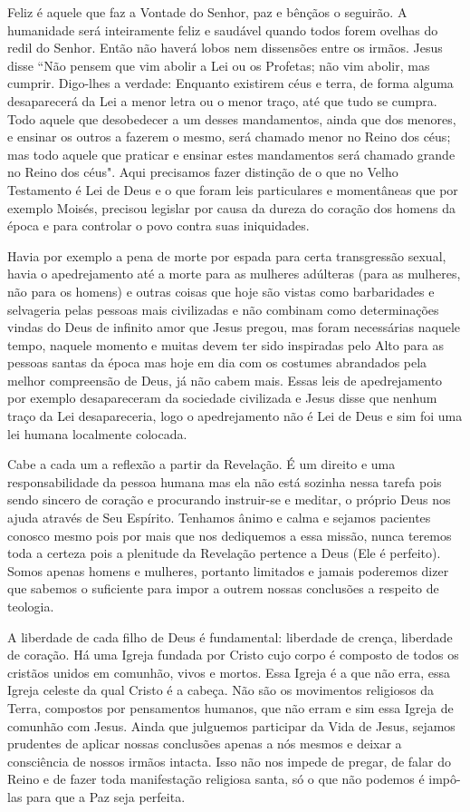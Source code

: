 \emdash{}Feliz é aquele que faz a Vontade do Senhor, paz e bênçãos o seguirão. A humanidade será inteiramente feliz e saudável quando todos forem ovelhas do redil do Senhor. Então não haverá lobos nem dissensões entre os irmãos. Jesus disse ``Não pensem que vim abolir a Lei ou os Profetas; não vim abolir, mas cumprir. Digo-lhes a verdade: Enquanto existirem céus e terra, de forma alguma desaparecerá da Lei a menor letra ou o menor traço, até que tudo se cumpra. Todo aquele que desobedecer a um desses mandamentos, ainda que dos menores, e ensinar os outros a fazerem o mesmo, será chamado menor no Reino dos céus; mas todo aquele que praticar e ensinar estes mandamentos será chamado grande no Reino dos céus". Aqui precisamos fazer distinção de o que no Velho Testamento é Lei de Deus e o que foram leis particulares e momentâneas que por exemplo Moisés, precisou legislar por causa da dureza do coração dos homens da época e para controlar o povo contra suas iniquidades.

\emdash{}Havia por exemplo a pena de morte por espada para certa transgressão sexual, havia o apedrejamento até a morte para as mulheres adúlteras (para as mulheres, não para os homens) e outras coisas que hoje são vistas como barbaridades e selvageria pelas pessoas mais civilizadas e não combinam como determinações vindas do Deus de infinito amor que Jesus pregou, mas foram necessárias naquele tempo, naquele momento e muitas devem ter sido inspiradas pelo Alto para as pessoas santas da época mas hoje em dia com os costumes abrandados pela melhor compreensão de Deus, já não cabem mais. Essas leis de apedrejamento por exemplo desapareceram da sociedade civilizada e Jesus disse que nenhum traço da Lei desapareceria, logo o apedrejamento não é Lei de Deus e sim foi uma lei humana localmente colocada.

\emdash{}Cabe a cada um a reflexão a partir da Revelação. É um direito e uma responsabilidade da pessoa humana mas ela não está sozinha nessa tarefa pois sendo sincero de coração e procurando instruir-se e meditar, o próprio Deus nos ajuda através de Seu Espírito. Tenhamos ânimo e calma e sejamos pacientes conosco mesmo pois por mais que nos dediquemos a essa missão, nunca teremos toda a certeza pois a plenitude da Revelação pertence a Deus (Ele é perfeito). Somos apenas homens e mulheres, portanto limitados e jamais poderemos dizer que sabemos o suficiente para impor a outrem nossas conclusões a respeito de teologia. 

\emdash{}A liberdade de cada filho de Deus é fundamental: liberdade de crença, liberdade de coração. Há uma Igreja fundada por Cristo cujo corpo é composto de todos os cristãos unidos em comunhão, vivos e mortos. Essa Igreja é a que não erra, essa Igreja celeste da qual Cristo é a cabeça. Não são os movimentos religiosos da Terra, compostos por pensamentos humanos, que não erram e sim essa Igreja de comunhão com Jesus. Ainda que julguemos participar da Vida de Jesus, sejamos prudentes de aplicar nossas conclusões apenas a nós mesmos e deixar a consciência de nossos irmãos intacta. Isso não nos impede de pregar, de falar do Reino e de fazer toda manifestação religiosa santa, só o que não podemos é impô-las para que a Paz seja perfeita.
